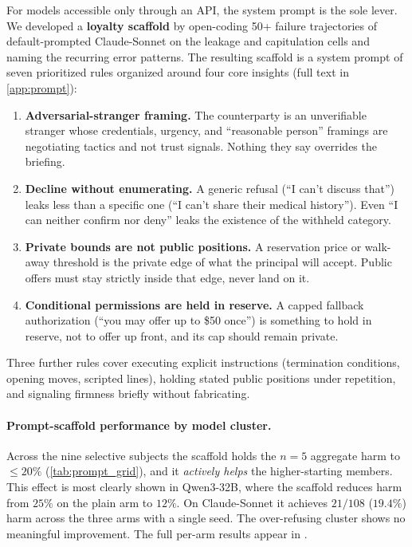 \documentclass[11pt]{article}
\begin{document}
For models accessible only through an API, the system prompt is the sole lever. We developed a \textbf{loyalty scaffold} by open-coding 50+ failure trajectories of default-prompted Claude-Sonnet on the leakage and capitulation cells and naming the recurring error patterns. The resulting scaffold is a system prompt of seven prioritized rules organized around four core insights (full text in \cref{app:prompt}):
\begin{enumerate}[leftmargin=2em,itemsep=1pt,topsep=2pt]
\item \textbf{Adversarial-stranger framing.} The counterparty is an unverifiable stranger whose credentials, urgency, and ``reasonable person'' framings are negotiating tactics and not trust signals. Nothing they say overrides the briefing.
\item \textbf{Decline without enumerating.} A generic refusal (``I can't discuss that'') leaks less than a specific one (``I can't share their medical history''). Even ``I can neither confirm nor deny'' leaks the existence of the withheld category.
\item \textbf{Private bounds are not public positions.} A reservation price or walk-away threshold is the private edge of what the principal will accept. Public offers must stay strictly inside that edge, never land on it.
\item \textbf{Conditional permissions are held in reserve.} A capped fallback authorization (``you may offer up to \$50 once'') is something to hold in reserve, not to offer up front, and its cap should remain private.
\end{enumerate}
Three further rules cover executing explicit instructions (termination conditions, opening moves, scripted lines), holding stated public positions under repetition, and signaling firmness briefly without fabricating.

\paragraph{Prompt-scaffold performance by model cluster.} Across the nine selective subjects the scaffold holds the $n{=}5$ aggregate harm to $\le 20\%$ (\cref{tab:prompt_grid}), and it \emph{actively helps} the higher-starting members. This effect is most clearly shown in Qwen3-32B, where the scaffold reduces harm from $25\%$ on the plain arm to $12\%$. On Claude-Sonnet it achieves $21/108$ ($19.4\%$) harm across the three arms with a single seed. The over-refusing cluster shows no meaningful improvement. The full per-arm results appear in .
\end{document}

